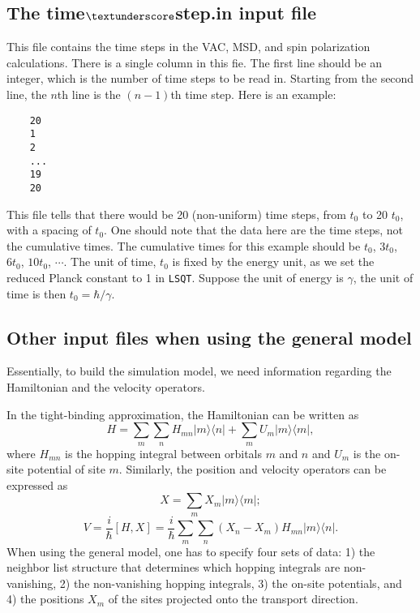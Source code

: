 \documentclass[12pt,a4paper]{report}
\begin{document}
\subsection{The time$\textunderscore$step.in input file}


This file contains the time steps in the VAC, MSD, and spin polarization calculations. There is a single column in this fie. The first line should be an integer, which is the number of time steps to be read in. Starting from the second line, the $n$th line is the $(n-1)$th time step. Here is an example:
\begin{verbatim}
    20
    1
    2
    ...
    19
    20
\end{verbatim}
This file tells that there would be 20 (non-uniform) time steps, from $t_0$ to 20 $t_0$, with a spacing of $t_0$. One should note that the data here are the time steps, not the cumulative times. The cumulative times for this example should be $t_0$, $3t_0$, $6t_0$, $10t_0$, $\cdots$. The unit of time, $t_0$ is fixed by the energy unit, as we set the reduced Planck constant to 1 in \verb"LSQT". Suppose the unit of energy is $\gamma$, the unit of time is then $t_0=\hbar/\gamma$.

\subsection{Other input files when using the general model}

Essentially, to build the simulation model, we need information regarding the Hamiltonian and the velocity operators.

In the tight-binding approximation, the Hamiltonian can be written as
\begin{equation}
 H = \sum_m\sum_n H_{mn} |m\rangle \langle n| 
 + \sum_m U_m |m\rangle \langle m|,
\end{equation}
where $H_{mn}$ is the hopping integral between orbitals $m$ and $n$ and $U_m$ is the on-site potential of site $m$. Similarly, the position and velocity operators can be expressed as
\begin{equation}
 X = \sum_{m} X_m |m\rangle \langle m|;
\end{equation}
\begin{equation}
 V = \frac{i}{\hbar} [H,X]
= \frac{i}{\hbar} \sum_m\sum_n
 (X_n-X_m) H_{mn} |m\rangle \langle n|.
\end{equation}
When using the general model, one has to specify four sets of data: 1) the neighbor list structure that determines which hopping integrals are non-vanishing, 2) the non-vanishing hopping integrals, 3) the on-site potentials, and 4) the positions $X_m$ of the sites projected onto the transport direction.
\end{document}
